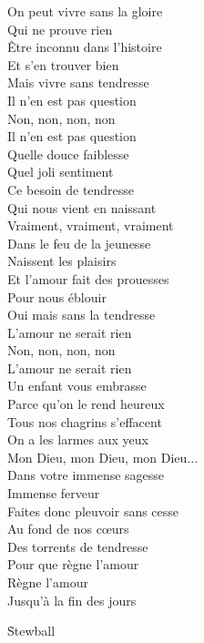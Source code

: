 \documentclass{novel}
\begin{document}
{\begin{minipage}[t][0.65\textheight][t]{\textwidth}
\begin{multicols}{2}
On peut vivre sans la gloire \\
Qui ne prouve rien \\
Être inconnu dans l'histoire \\
Et s'en trouver bien \\
Mais vivre sans tendresse \\
Il n'en est pas question \\
Non, non, non, non \\
Il n'en est pas question \\

Quelle douce faiblesse \\
Quel joli sentiment \\
Ce besoin de tendresse \\
Qui nous vient en naissant \\
Vraiment, vraiment, vraiment \\

Dans le feu de la jeunesse \\
Naissent les plaisirs \\
Et l'amour fait des prouesses \\
Pour nous éblouir \\
Oui mais sans la tendresse \\
L'amour ne serait rien \\
Non, non, non, non \\
L'amour ne serait rien \\

Un enfant vous embrasse \\
Parce qu'on le rend heureux \\
Tous nos chagrins s'effacent \\
On a les larmes aux yeux \\
Mon Dieu, mon Dieu, mon Dieu... \\
Dans votre immense sagesse \\
Immense ferveur \\
Faites donc pleuvoir sans cesse \\
Au fond de nos cœurs \\
Des torrents de tendresse \\
Pour que règne l'amour \\
Règne l'amour \\
Jusqu'à la fin des jours

\end{multicols}
\end{minipage}
}

\newpage
\normalsize
\h*{Stewball}
\end{document}
